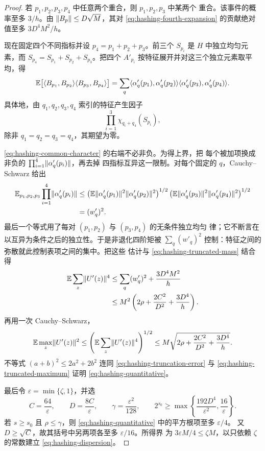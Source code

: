 \begin{proof}
若 $p_1,p_2,p_3,p_4$ 中任意两个重合，则 $p_1,p_2,p_3$ 中某两个
重合。该事件的概率至多 $3/h$。由 $\lVert B_p\rVert\le D\sqrt M$，其对
\eqref{eq:hashing-fourth-expansion} 的贡献绝对值至多 $3D^4M^2/h$。

现在固定四个不同指标并设 $p_4=p_1+p_2+p_3$。前三个 $S_{p_i}$ 是
$H$ 中独立均匀元素，而 $S_{p_4}=S_{p_1}+S_{p_2}+S_{p_3}$。把四个
$A'_{p_i}$ 按特征展开并对这三个独立元素取平均，得
\begin{equation}\label{eq:hashing-common-character}
 \mathbb E\bigl[\langle B_{p_1},B_{p_2}\rangle\langle B_{p_3},B_{p_4}\rangle\bigr]
 =\sum_q
   \langle \alpha'_q(p_1),\alpha'_q(p_2)\rangle
   \langle \alpha'_q(p_3),\alpha'_q(p_4)\rangle.
\end{equation}
具体地，由 $q_1,q_2,q_3,q_4$ 索引的特征产生因子
\[
 \prod_{i=1}^3\chi_{q_i+q_4}(S_{p_i}),
\]
除非 $q_1=q_2=q_3=q_4$，其期望为零。

\eqref{eq:hashing-common-character} 的右端不必非负。为得上界，把
每个被加项换成非负的 $\prod_{i=1}^4\lVert\alpha'_q(p_i)\rVert$，再去掉
四指标互异这一限制。对每个固定的 $q$，Cauchy--Schwarz 给出
\begin{align*}
 \mathbb E_{p_1,p_2,p_3}\prod_{i=1}^4\lVert\alpha'_q(p_i)\rVert
 &\le
 \left(\mathbb E\lVert\alpha'_q(p_1)\rVert^2
             \lVert\alpha'_q(p_2)\rVert^2\right)^{1/2}
 \left(\mathbb E\lVert\alpha'_q(p_3)\rVert^2
             \lVert\alpha'_q(p_4)\rVert^2\right)^{1/2}\\
 &=(w'_q)^2.
\end{align*}
最后一个等式用了每对 $(p_1,p_2)$ 与 $(p_3,p_4)$ 的无条件独立均匀
律；它不断言在以互异为条件之后的独立性。于是非退化四阶矩被
$\sum_q(w'_q)^2$ 控制：特征之间的弥散就此控制表项之间的集中。把这些
估计与 \eqref{eq:hashing-truncated-mass} 结合得
\begin{align*}
 \mathbb E\sum_z\lVert U'(z)\rVert^4
 &\le \sum_q(w'_q)^2+\frac{3D^4M^2}{h}\\
 &\le M^2\left(2\rho+\frac{2C^2}{D^2}+\frac{3D^4}{h}\right).
\end{align*}
再用一次 Cauchy--Schwarz，
\begin{equation}\label{eq:hashing-truncated-maximum}
 \mathbb E\max_z\lVert U'(z)\rVert^2
 \le\left(\mathbb E\sum_z\lVert U'(z)\rVert^4\right)^{1/2}
 \le M\sqrt{2\rho+\frac{2C^2}{D^2}+\frac{3D^4}{h}}.
\end{equation}
不等式 $(a+b)^2\le2a^2+2b^2$ 连同
\eqref{eq:hashing-truncation-error} 与
\eqref{eq:hashing-truncated-maximum} 证明
\eqref{eq:hashing-quantitative}。

最后令 $\varepsilon=\min\{\zeta,1\}$，并选
\[
 C=\frac{64}{\varepsilon},\qquad
 D=\frac{8C}{\varepsilon},\qquad
 \gamma=\frac{\varepsilon^2}{128},\qquad
 2^{s_0}\ge
 \max\left\{\frac{192D^4}{\varepsilon^2},\frac{16}{\varepsilon}\right\}.
\]
若 $s\ge s_0$ 且 $\rho\le\gamma$，则
\eqref{eq:hashing-quantitative} 中的平方根项至多 $\varepsilon/4$。
又 $D\ge\sqrt C$，故其括号中另两项各至多 $\varepsilon/16$。所得界
为 $3\varepsilon M/4\le\zeta M$，以只依赖 $\zeta$ 的常数建立
\eqref{eq:hashing-dispersion}。
\end{proof}

